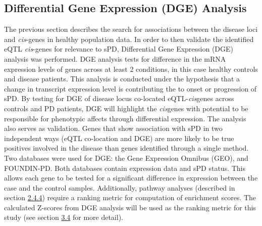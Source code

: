 \documentclass{article}
\begin{document}
\subsection{Differential Gene Expression (DGE) Analysis}
\label{subsec:validation}
The previous section describes the search for associations between the disease loci and \textit{cis}-genes in healthy population data. In order to then validate the identified eQTL \textit{cis}-genes for relevance to sPD, Differential Gene Expression (DGE) analysis  was performed. DGE analysis tests for difference in the mRNA expression levels of genes across at least 2 conditions, in this case healthy controls and disease patients. This analysis is conducted under the hypothesis that a change in transcript expression level is contributing the to onset or progression of sPD. By testing for DGE of disease locus co-located eQTL-\textit{cis}genes across controls and PD patients, DGE will highlight the \textit{cis}genes with potential to be responsible for phenotypic affects through differential expression. The analysis also serves as validation. Genes that show association with sPD in two independent ways (eQTL co-location and DGE) are more likely to be true positives involved in the disease than genes identified through a single method.  Two databases were used for DGE: the Gene Expression Omnibus (GEO), and FOUNDIN-PD. Both databases contain expression data and sPD status. This allows each gene to be tested for a significant difference in expression between the case and the control samples. Additionally, pathway analyses (described in section \hyperref[subsubsec:pathwaysandnetworks]{2.4.4}) require a ranking metric for computation of enrichment scores. The calculated Z-scores from DGE analysis will be used as the ranking metric for this study (see section \hyperref[subsec:pathways]{3.4} for more detail). 
\end{document}
